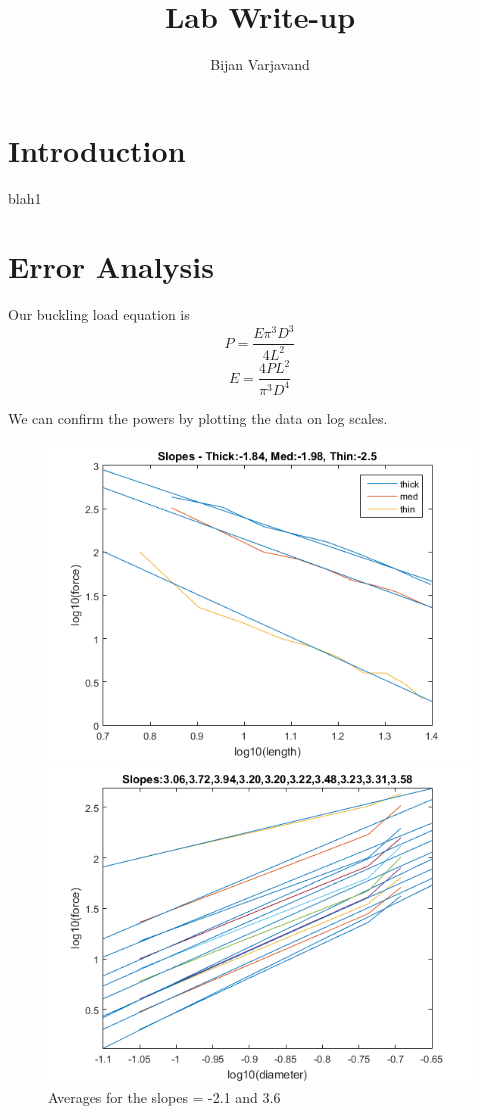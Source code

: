 \documentclass{article}
\author{Bijan Varjavand}
\title{Lab Write-up}
\begin{document}
\maketitle

\section{Introduction}

blah1

\section{Error Analysis}

Our buckling load equation is
$$P = \frac{E\pi ^3D^3}{4L^2}$$
$$E = \frac{4PL^2}{\pi ^3D^4}$$

We can confirm the powers by plotting the data on log scales.

\begin{figure}[h]
	\centering
	\begin{minipage}{0.5\textwidth}
		\includegraphics[scale=0.3]{Lab1f1.png}
	\end{minipage}%
	\begin{minipage}{0.5\textwidth}
		\includegraphics[scale=0.3]{Lab1f3.png}
	\end{minipage}
	\caption{Averages for the slopes = -2.1 and 3.6}
\end{figure}
\end{document}
